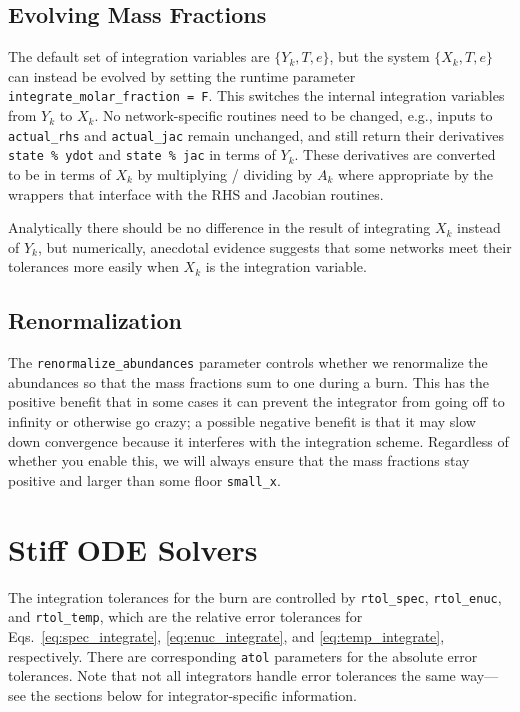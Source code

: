 

\subsection{Evolving Mass Fractions}

The default set of integration variables are $\{Y_k, T, e\}$, but the
system $\{X_k, T, e\}$ can instead be evolved by setting the runtime
parameter {\tt integrate\_molar\_fraction = F}.  This switches the
internal integration variables from $Y_k$ to $X_k$.  No
network-specific routines need to be changed, e.g., inputs to {\tt
  actual\_rhs} and {\tt actual\_jac} remain unchanged, and still
return their derivatives {\tt state \% ydot} and {\tt state \% jac} in
terms of $Y_k$.  These derivatives are converted to be in terms of
$X_k$ by multiplying / dividing by $A_k$ where appropriate by the
wrappers that interface with the RHS and Jacobian routines.

Analytically there should be no difference in the result of
integrating $X_k$ instead of $Y_k$, but numerically, anecdotal
evidence suggests that some networks meet their tolerances more easily
when $X_k$ is the integration variable.

\subsection{Renormalization}

The {\tt renormalize\_abundances} parameter controls whether we
renormalize the abundances so that the mass fractions sum to one
during a burn. This has the positive benefit that in some cases it can
prevent the integrator from going off to infinity or otherwise go
crazy; a possible negative benefit is that it may slow down
convergence because it interferes with the integration
scheme. Regardless of whether you enable this, we will always ensure
that the mass fractions stay positive and larger than some floor
{\tt small\_x}.



\section{Stiff ODE Solvers}
\label{ch:networks:integrators}

The integration tolerances for the burn are controlled by
\texttt{rtol\_spec}, \texttt{rtol\_enuc}, and \texttt{rtol\_temp},
which are the relative error tolerances for
Eqs.~\ref{eq:spec_integrate}, \ref{eq:enuc_integrate}, and
\ref{eq:temp_integrate}, respectively. There are corresponding
\texttt{atol} parameters for the absolute error tolerances. Note that
not all integrators handle error tolerances the same way---see the
sections below for integrator-specific information.

